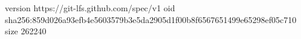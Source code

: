 version https://git-lfs.github.com/spec/v1
oid sha256:859d026a93efb4e5603579b3e5da2905d1f00b8f6567651499e65298ef05c710
size 262240
